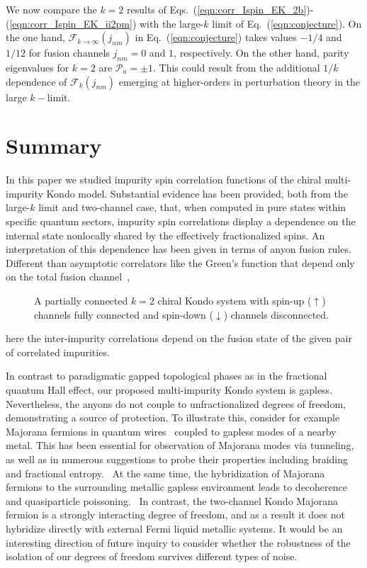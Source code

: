 \documentclass[aps,prb,twocolumn,superscriptaddress]{revtex4-1}
\begin{document}
We now compare the $k=2$ results of Eqs.~(\ref{eqn:corr_Ispin_EK_2b})-(\ref{eqn:corr_Ispin_EK_ii2pm}) with the large-$k$ limit of Eq.~(\ref{eqn:conjecture}). 
On the one hand, $\mathcal{F}_{k\to\infty}(j_{nm})$ in Eq.~(\ref{eqn:conjecture}) takes values $-1/4$ and $1/12$ for fusion channels $j_{nm}=0$ and $1$, respectively. On the other hand, parity eigenvalues for $k=2$ are $\mathcal{P}_a = \pm 1$. This could result from the additional $1/k$ dependence of $\mathcal{F}_{k}(j_{nm})$ emerging at higher-orders in perturbation theory in the large $k-$limit. 


\section{Summary} \label{sec:5}
In this paper we studied impurity spin correlation functions of the chiral multi-impurity Kondo model. Substantial evidence has been provided, both from the large-$k$ limit and two-channel case, that, when computed in pure states within specific quantum sectors, impurity spin correlations display a dependence on the internal state nonlocally shared by the effectively fractionalized spins. An interpretation of this dependence has been given in terms of anyon fusion rules. Different than asymptotic correlators like the Green's function that depend only on the total fusion channel~\cite{lopes2020anyons}, 
\begin{figure}[!ht]
	\caption{A partially connected $k=2$ chiral Kondo system with spin-up ($\uparrow$) channels fully connected and spin-down ($\downarrow$) channels disconnected.}
	\label{fig:system_partial} 
\end{figure}
here the inter-impurity correlations depend on the fusion state of the given pair of correlated impurities.

In contrast to  paradigmatic gapped topological phases as in the fractional quantum Hall effect, our proposed multi-impurity Kondo system is gapless. Nevertheless, the anyons do not couple to unfractionalized degrees of freedom, demonstrating a source of protection. 
To illustrate this, consider for example Majorana fermions in quantum wires~\cite{kitaev2001unpaired,alicea2012new,leijnse2012introduction,beenakker2013search} coupled to gapless modes of a nearby metal. This has been essential for observation of Majorana modes via tunneling,~\cite{mourik2012signatures,das2012zero} as well as in numerous suggestions to probe their properties including braiding~\cite{plugge2016roadmap,vijay2016teleportation,dahan2017non,dahan2020dynamically} and fractional entropy.~\cite{smirnov2015majorana,sela2019detecting} At the same time, the hybridization of Majorana fermions to the surrounding metallic gapless environment leads to decoherence and quasiparticle poissoning.~\cite{rainis2012majorana,albrecht2017transport,karzig2021quasiparticle} In contrast, the two-channel Kondo Majorana fermion is a strongly interacting degree of freedom, and as a result it does not hybridize directly with external Fermi liquid metallic systems. It would be an interesting direction of future inquiry to consider whether the robustness of the isolation of our degrees of freedom survives different types of noise.
\end{document}
